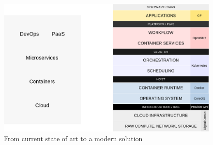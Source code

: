 \begin{figure}[htbp]
\centering
\includegraphics{media/ch2-solution.png}
\caption{From current state of art to a modern solution}
\end{figure}